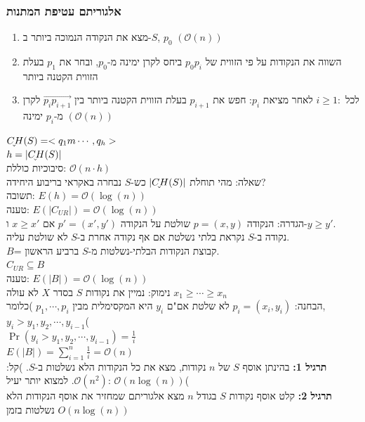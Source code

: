 \documentclass{article}
\makeatletter
\newcommand{\uhat}{\underaccent{\check}}
\newcommand*{\saved@uline}{}
\let\saved@uline\uline
\newcommand*{\mathuline}{%
  \mathpalette{\math@uline\saved@uline}%
}
\newcommand*{\math@uline}[3]{%
  \mbox{#1{$#2#3\m@th$}}%
}
\renewcommand*{\uline}{%
  \relax  
  \ifmmode
    \expandafter\mathuline
  \else
    \expandafter\saved@uline
  \fi
}
\makeatother
\begin{document}
\subsubsection{אלגוריתם עטיפת המתנות}
\begin{enumerate}
\item מצא את הנקודה הנמוכה ביותר ב-$S$, $p_0$ $(\mathcal{O}(n))$
\item השווה את הנקודות על פי הזווית של $p_0 p_i$ ביחס לקרן ימינה מ-$p_0$, ובחר את $p_1$ בעלת הזווית הקטנה ביותר
\item לכל $i \geq 1:$ לאחר מציאת $p_i$: חפש את $p_{i+1}$ בעלת הזווית הקטנה ביותר בין $\overrightarrow{p_i p_{i+1}}$ לקרן מ-$p_i$ ימינה $(\mathcal{O}(n))$
\end{enumerate}
$\uhat{CH}(S)= <q_1m \cdots, q_h>$\\
$h=|\uhat{CH}(S)|$\\
סיבוכיות כוללת: $\mathcal{O}(n \cdot h)$\\
\uline{שאלה:} מהי תוחלת $|\uhat{CH}(S)|$ כש-$S$ נבחרה באקראי בריבוע היחידה?\\
\uline{תשובה:} $E(h)= \mathcal{O}(\log(n))$\\
\uline{טענה:} $E(|C_{UR}|)= \mathcal{O}(\log(n))$\\
\uline{הגדרה:} הנקודה $p=(x,y)$ שולטת על הנקודה $p'=(x',y')$ אם $x \geq x'$ ו-$y \geq y'$.\\
נקודה ב-$S$ נקראת בלתי נשלטת אם אף נקודה אחרת ב-$S$ לא שולטת עליה.\\
$B$= קבוצת הנקודות הבלתי-נשלטות מ-$S$ ברביע הראשון.\\
$C_{UR} \subseteq B$\\
\uline{טענה:} $E(|B|)= \mathcal{O}(\log(n))$\\
\uline{נימוק:} נמיין את נקודות $S$ בסדר $X$ לא עולה $x_1 \geq \cdots \geq x_n$\\
\uline{הבחנה:}
$p_i=(x_i, y_i)$ לא שלטת אם"ם $y_i$ היא המקסימלית מבין $p_1, \cdots, p_i$ )כלומר, $y_i>y_1, y_2, \cdots, y_{i-1}$(\\
$\Pr(y_i>y_1, y_2, \cdots, y_{i-1})= \frac{1}{i}$\\
$E(|B|)= \sum_{i=1}^n \frac{1}{i}= \mathcal{O}(n)$\\
\textbf{תרגיל 1:} בהינתן אוסף $S$ של $n$ נקודות, מצא את כל הנקודות הלא נשלטות ב-$S$. )קל: $\mathcal{O}(n^2)$. למצוא יותר יעיל: $\mathcal{O}(n \log(n))$(\\
\noindent\textbf{תרגיל 2:} קלט אוסף נקודות $S$ בגודל $n$ מצא אלגוריתם שמחזיר את אוסף הנקודות הלא נשלטות בזמן $O(n\log(n))$
\end{document}
